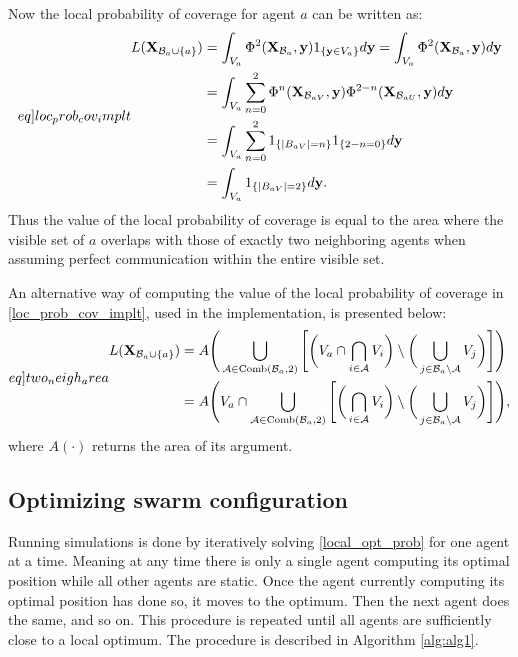 Now the local probability of coverage for agent $a$ can be written as:
\begin{equation}\label[eq]{loc_prob_cov_implt}
  \begin{split}
    L(\mathbf{X}_{\mathcal{B}_{a}\cup\{a\}}) &= \int_{V_{a}}\Phi^{2}(\mathbf{X}_{\mathcal{B}_{a}}, \mathbf{y})1_{\{\mathbf{y}\in V_{a}\}}d\mathbf{y} = \int_{V_{a}}\Phi^{2}(\mathbf{X}_{\mathcal{B}_{a}}, \mathbf{y})d\mathbf{y}\\
    &= \int_{V_{a}}\sum_{n = 0}^{2} \Phi^{n}(\mathbf{X}_{\mathcal{B}_{a V}}, \mathbf{y})\Phi^{2-n}(\mathbf{X}_{\mathcal{B}_{a U}},\mathbf{y})d\mathbf{y}\\
    &= \int_{V_{a}}\sum_{n = 0}^{2}1_{\{|B_{a V}| = n\}}1_{\{2-n = 0\}}d\mathbf{y}\\
    &= \int_{V_{a}}1_{\{|B_{a V}| = 2\}}d\mathbf{y}.
  \end{split}
\end{equation}
Thus the value of the local probability of coverage is equal to the area where the visible set of $a$ overlaps with those of exactly two neighboring agents when assuming perfect communication within the entire visible set.

An alternative way of computing the value of the local probability of coverage in \eqref{loc_prob_cov_implt}, used in the implementation,
is presented below:
\begin{equation}\label[eq]{two_neigh_area}
  \begin{split}
    L(\mathbf{X}_{\mathcal{B}_{a}\cup\{a\}}) &= A\Biggr(\bigcup_{\mathcal{A}\in \mathrm{Comb}(\mathcal{B}_{a}, 2)}\Bigg[\bigg(V_{a}\cap \bigcap_{i\in\mathcal{A}}V_{i}\bigg)\setminus\bigg(\bigcup_{j\in\mathcal{B}_{a}\setminus\mathcal{A}}V_{j}\bigg)\Bigg]\Biggr)\\
    &= A\Biggr(V_{a}\cap\bigcup_{\mathcal{A}\in \mathrm{Comb}(\mathcal{B}_{a}, 2)}\Bigg[\bigg(\bigcap_{i\in\mathcal{A}}V_{i}\bigg)\setminus\bigg(\bigcup_{j\in\mathcal{B}_{a}\setminus\mathcal{A}}V_{j}\bigg)\Bigg]\Biggr),
  \end{split}
\end{equation}
where $A(\cdot)$ returns the area of its argument.
\subsection{Optimizing swarm configuration}
Running simulations is done by iteratively solving \eqref{local_opt_prob} for one agent at a time. Meaning at any time there is only
a single agent computing its optimal position while all other agents are static. Once the agent currently computing its optimal position
has done so, it moves to the optimum. Then the next agent does the same, and so on. This procedure is repeated
until all agents are sufficiently close to a local optimum. The procedure is described in Algorithm \ref{alg:alg1}.

